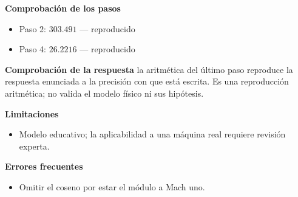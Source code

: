 \documentclass[10pt,openany]{book}
\begin{document}
\begin{tcolorbox}[title={Problema resuelto 4}, studiumworked, breakable]
\noindent\textbf{Comprobación de los pasos}
\begin{itemize}
\item Paso 2: $303.491$ — reproducido
\item Paso 4: $26.2216$ — reproducido
\end{itemize}

\noindent\textbf{Comprobación de la respuesta} la aritmética del último paso reproduce la respuesta enunciada a la precisión con que está escrita. Es una reproducción aritmética; no valida el modelo físico ni sus hipótesis.

\noindent\textbf{Limitaciones}
\begin{itemize}
\item Modelo educativo; la aplicabilidad a una máquina real requiere revisión experta.
\end{itemize}

\noindent\textbf{Errores frecuentes}
\begin{itemize}
\item Omitir el coseno por estar el módulo a Mach uno.
\end{itemize}
\end{tcolorbox}
\end{document}
